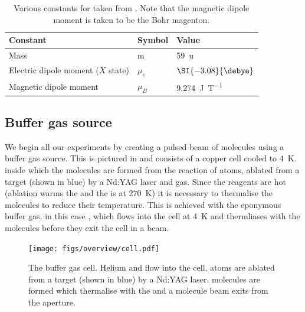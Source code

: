 \begin{table}
  \centering
\begin{tabular}{lll}
  \hline\hline
  Constant & Symbol & Value \\
  \hline
  Mass & m & \SI{59}{\amu}\\
  Electric dipole moment ($X$ state) & $\mu_e$ & $\SI{-3.08}{\debye}$\\
  Magnetic dipole moment & $\mu_B$ & \SI{9.274}{\joule\per\tesla} \\
 \hline
\end{tabular}
\caption{
  Various constants for \CaF{} taken from . Note that
  the magnetic dipole moment is taken to be the Bohr magenton.
  }
  \label{overview:table:constants}
\end{table}

\subsection*{Buffer gas source}

We begin all our experiments by creating a pulsed beam of \CaF{} molecules
using a buffer gas source. This is pictured in 
and consists of a copper cell cooled to \SI{4}{\kelvin}. inside which the
\CaF{} molecules are formed from the reaction of \Ca{} atoms, ablated from a
target (shown in blue) by a Nd:YAG laser and \SFsix{} gas. Since the reagents
are hot (ablation warms the \Ca{} and the \SFsix{} is at \SI{270}{\kelvin}) it
is necessary to thermalise the molecules to reduce their temperature. This is
achieved with the eponymous buffer gas, in this case \He{}, which flows into
the cell at \SI{4}{\kelvin} and thermliases with the molecules before they exit
the cell in a beam.

\begin{figure}
  \centering
  \texttt{[image: figs/overview/cell.pdf]}
  \caption{The buffer gas cell. Helium and \SFsix flow into the cell. \Ca{}
  atoms are ablated from a target (shown in blue) by a Nd:YAG laser. \CaF{} molecules are
formed which thermalise with the \He{} and a molecule beam exits from the aperture.}
  \label{overview:fig:source}
\end{figure}

